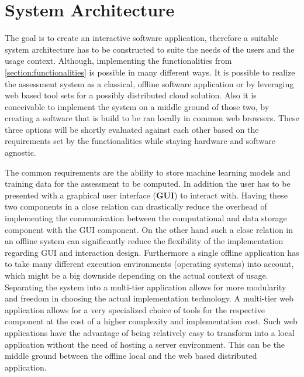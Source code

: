\documentclass[11pt,a4paper,english]{scrreprt}
\begin{document}
\section{System Architecture}\label{section:system_architecture}
The goal is to create an interactive software application, therefore a suitable system architecture has to be constructed to suite the needs of the users and the usage context. Although, implementing the functionalities from \autoref{section:functionalities} is possible in many different ways. It is possible to realize the assessment system as a classical, offline software application or by leveraging web based tool sets for a possibly distributed cloud solution. Also it is conceivable to implement the system on a middle ground of those two, by creating a software that is build to be ran locally in common web browsers. These three options will be shortly evaluated against each other based on the requirements set by the functionalities while staying hardware and software agnostic. 

The common requirements are the ability to store machine learning models and training data for the assessment to be computed. In addition the user has to be presented with a graphical user interface (\textbf{GUI}) to interact with. Having these two components in a close relation can drastically reduce the overhead of implementing the communication between the computational and data storage component with the GUI component. On the other hand such a close relation in an offline system can significantly reduce the flexibility of the implementation regarding GUI and interaction design. Furthermore a single offline application has to take many different execution environments (operating systems) into account, which might be a big downside depending on the actual context of usage. Separating the system into a multi-tier application allows for more modularity and freedom in choosing the actual implementation technology. A multi-tier web application allows for a very specialized choice of tools for the respective component at the cost of a higher complexity and implementation cost. Such web applications have the advantage of being relatively easy to transform into a local application without the need of hosting a server environment. This can be the middle ground between the offline local and the web based distributed application.
\end{document}
